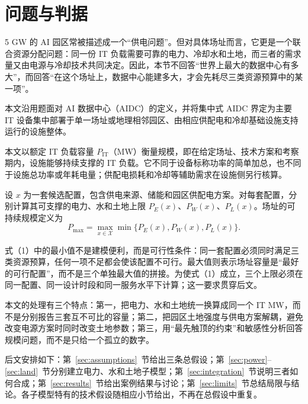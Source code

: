 \documentclass{mcmthesis}
\begin{document}
\maketitle
\tableofcontents
\newpage

\section{问题与判据}

5 GW 的 AI 园区常被描述成一个“供电问题”。但对具体场址而言，它更是一个联合资源分配问题：同一份 IT 负载需要可靠的电力、冷却水和土地，而三者的需求量又由电源与冷却技术共同决定。因此，本节不回答“世界上最大的数据中心有多大”，而回答“在这个场址上，数据中心能建多大，才会先耗尽三类资源预算中的某一项”。

本文沿用题面对 AI 数据中心（AIDC）的定义，并将集中式 AIDC 界定为主要 IT 设备集中部署于单一场址或地理相邻园区、由相应供配电和冷却基础设施支持运行的设施整体。

本文以额定 IT 负载容量 \(P_{\mathrm{IT}}\)（MW）衡量规模，即在给定场址、技术方案和考察期内，设施能够持续支撑的 IT 负载。它不同于设备标称功率的简单加总，也不同于设施总功率或年耗电量；供配电损耗和冷却等辅助需求在设施侧另行核算。

设 \(x\) 为一套候选配置，包含供电来源、储能和园区供配电方案。对每套配置，分别计算其可支撑的电力、水和土地上限 \(P_E(x)\)、\(P_W(x)\)、\(P_L(x)\)。场址的可持续规模定义为
\begin{equation}
P_{\max}=\max_{x\in\mathcal X}\min\{P_E(x),P_W(x),P_L(x)\}.
\tag{1}
\end{equation}

式（1）中的最小值不是建模便利，而是可行性条件：同一套配置必须同时满足三类资源预算，任何一项不足都会使该配置不可行。最大值则表示场址容量是“最好的可行配置”，而不是三个单独最大值的拼接。为使式（1）成立，三个上限必须在同一配置、同一设计时段和同一服务水平下计算；这一要求贯穿后文。

本文的处理有三个特点：第一，把电力、水和土地统一换算成同一个 IT MW，而不是分别报告三套互不可比的容量；第二，把园区土地强度与供电方案解耦，避免改变电源方案时同时改变土地参数；第三，用“最先触顶的约束”和敏感性分析回答规模问题，而不是只给一个孤立的数字。

后文安排如下：第~\ref{sec:assumptions}~节给出三条总假设；第~\ref{sec:power}--\ref{sec:land}~节分别建立电力、水和土地子模型；第~\ref{sec:integration}~节说明三者如何合成；第~\ref{sec:results}~节给出案例结果与讨论；第~\ref{sec:limits}~节总结局限与结论。各子模型特有的技术假设随相应小节给出，不再在总假设中重复。
\end{document}
